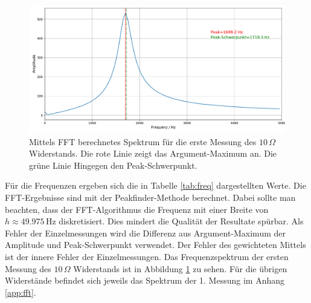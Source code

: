 \documentclass[a4paper, 12pt]{scrartcl}
\begin{document}
\begin{figure}[h]
\centering
\includegraphics[width=\textwidth]{plots/fft/fft_schwingung3_1.pdf}
\caption{Mittels FFT berechnetes Spektrum für die erste Messung des $10\,\Omega$ Widerstands. Die rote Linie zeigt das Argument-Maximum an. Die grüne Linie Hingegen den Peak-Schwerpunkt.}
\label{abb:fft1}
\end{figure}

Für die Frequenzen ergeben sich die in Tabelle \ref{tab:freq} dargestellten Werte. Die FFT-Ergebnisse sind mit der Peakfinder-Methode berechnet. Dabei sollte man beachten, dass der FFT-Algorithmus die Frequenz mit einer Breite von $h\approx 49.975 \,\text{Hz}$ diskretisiert. Dies mindert die Qualität der Resultate spürbar. Als Fehler der Einzelmessungen wird die Differenz aus Argument-Maximum der Amplitude und Peak-Schwerpunkt verwendet. Der Fehler des gewichteten Mittels ist der innere Fehler der Einzelmessungen. Das Frequenzspektrum der ersten Messung des $10\,\Omega$ Widerstands ist in Abbildung \ref{abb:fft1} zu sehen. Für die übrigen Widerstände befindet sich jeweils das Spektrum der 1. Messung im Anhang \ref{app:fft}.
\end{document}
